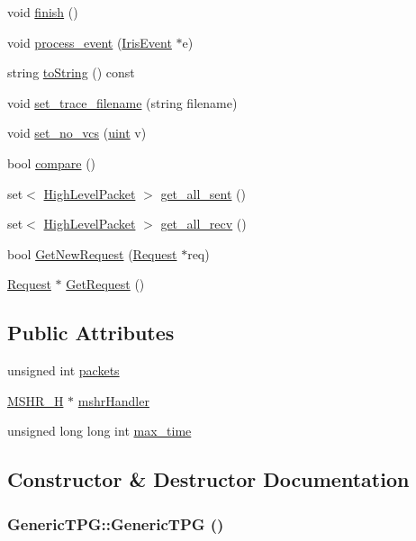 \begin{CompactItemize}
\item 
void \hyperlink{classGenericTPG_8dd8fa2cd2721789a63084d8fe912366}{finish} ()
\item 
void \hyperlink{classGenericTPG_a2e59f102384206268808835bcb9d5b5}{process\_\-event} (\hyperlink{classIrisEvent}{IrisEvent} $\ast$e)
\item 
string \hyperlink{classGenericTPG_c2e1dc7b0de824c846f37c4a1c282303}{toString} () const 
\item 
void \hyperlink{classGenericTPG_fe1f30bce868ee2caa01d3f7a2229945}{set\_\-trace\_\-filename} (string filename)
\item 
void \hyperlink{classGenericTPG_e95391a655cacb75ba23e7eb8b3cefef}{set\_\-no\_\-vcs} (\hyperlink{outputBuffer_8h_91ad9478d81a7aaf2593e8d9c3d06a14}{uint} v)
\item 
bool \hyperlink{classGenericTPG_d26b3d9a264ebe07d44b9194626c98d7}{compare} ()
\item 
set$<$ \hyperlink{classHighLevelPacket}{HighLevelPacket} $>$ \hyperlink{classGenericTPG_2b424dd4b2f5aa07a0231d69d5790470}{get\_\-all\_\-sent} ()
\item 
set$<$ \hyperlink{classHighLevelPacket}{HighLevelPacket} $>$ \hyperlink{classGenericTPG_aca7529b0e19d664ee40392b7761e338}{get\_\-all\_\-recv} ()
\item 
bool \hyperlink{classGenericTPG_e0d0461b59107eb3b4facb4d29ada948}{GetNewRequest} (\hyperlink{classRequest}{Request} $\ast$req)
\item 
\hyperlink{classRequest}{Request} $\ast$ \hyperlink{classGenericTPG_2e30905e10685209af2c6ff15bb4f07a}{GetRequest} ()
\end{CompactItemize}
\subsection*{Public Attributes}
\begin{CompactItemize}
\item 
unsigned int \hyperlink{classGenericTPG_373e1e2904c42be961f521c8b32e9f1e}{packets}
\item 
\hyperlink{classMSHR__H}{MSHR\_\-H} $\ast$ \hyperlink{classGenericTPG_03a0346d54282502eae314c9525da513}{mshrHandler}
\item 
unsigned long long int \hyperlink{classGenericTPG_f2b6690d9c38e72a408cde91480fe13e}{max\_\-time}
\end{CompactItemize}


\subsection{Constructor \& Destructor Documentation}
\hypertarget{classGenericTPG_4caf5cdc5c95a600391ecd2eb2c071fc}{
\subsubsection[{GenericTPG}]{\setlength{\rightskip}{0pt plus 5cm}GenericTPG::GenericTPG ()}}
\label{classGenericTPG_4caf5cdc5c95a600391ecd2eb2c071fc}


